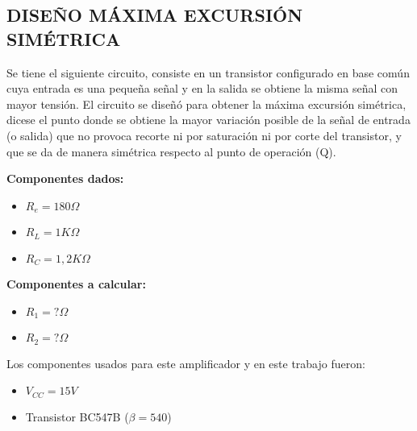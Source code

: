 \begin{multicols}{2}

	\section{DISEÑO MÁXIMA EXCURSIÓN SIMÉTRICA}

	\sangria{} Se tiene el siguiente circuito, consiste en un transistor configurado en base común cuya entrada es una pequeña señal y en la salida se obtiene la misma señal con mayor tensión.
	\sangria{} El circuito se diseñó para obtener la máxima excursión simétrica, dicese el punto donde se obtiene la mayor variación posible de la señal de entrada (o salida) que no provoca recorte ni por saturación ni por corte del transistor, y que se da de manera simétrica respecto al punto de operación (Q).


	\textbf{Componentes dados:}
    \begin{itemize}[nosep]
        \item $R_e = 180\Omega$
        \item $R_L = 1 K\Omega$
        \item $R_C = 1,2 K\Omega$
    \end{itemize}

    \textbf{Componentes a calcular:}
    \begin{itemize}[nosep]
        \item $R_1 = ?\Omega$
        \item $R_2 = ?\Omega$
    \end{itemize}

    \sangria{} Los componentes usados para este amplificador y en este trabajo fueron:
    \begin{itemize}[nosep]
        \item $V_{CC} = 15V$
        \item Transistor BC547B ($\beta = 540$)
    \end{itemize}


\end{multicols}
